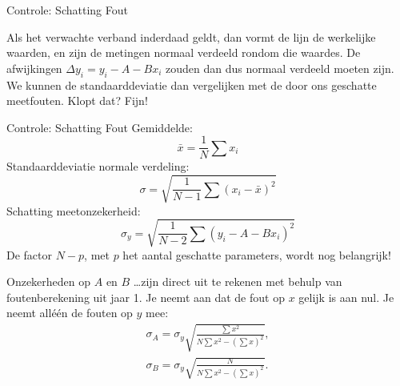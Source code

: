 \documentclass{beamer}
\newcommand{\tsum}{\textstyle\sum}
\begin{document}
\begin{frame}{Controle: Schatting Fout}
  \begin{center}
  \end{center}
  Als het verwachte verband inderdaad geldt, dan vormt de lijn de \alert{werkelijke waarden}, en zijn de metingen normaal verdeeld rondom die waardes. De afwijkingen $\Delta y_i = y_i - A - Bx_i$ zouden dan dus normaal verdeeld moeten zijn. We kunnen de standaarddeviatie dan vergelijken met de door ons geschatte meetfouten. Klopt dat? Fijn!
\end{frame}

\begin{frame}{Controle: Schatting Fout}
  Gemiddelde:
  \begin{equation*}
    \bar x = \frac{1}{N}\sum x_i  \tag{0 parameters}
  \end{equation*}
  Standaarddeviatie normale verdeling:
  \begin{equation*}
    \sigma = \sqrt{\frac{1}{N-1}\sum(x_i - \bar x)^2} \tag{1 parameter}
  \end{equation*}
  Schatting meetonzekerheid:
  \begin{equation*}
    \sigma_y = \sqrt{\frac{1}{N-2}\sum(y_i - A - Bx_i)^2} \tag{2 parameters}
  \end{equation*}
  \pause
  De factor $N - p$, met $p$ het aantal geschatte parameters, wordt nog belangrijk!
\end{frame}

\begin{frame}{Onzekerheden op $A$ en $B$}
  \dots zijn direct uit te rekenen met behulp van foutenberekening uit jaar 1. Je neemt aan dat de fout op $x$ gelijk is aan nul. Je neemt alléén de fouten op $y$ mee:
  \begin{gather*}
    \sigma_A = \sigma_y\sqrt{\frac{\tsum x^2}{N\tsum x^2 - (\tsum x)^2}}, \\[1em]
    \sigma_B = \sigma_y\sqrt{\frac{N}{N\tsum x^2 - (\tsum x)^2}}.
  \end{gather*}
\end{frame}
\end{document}
